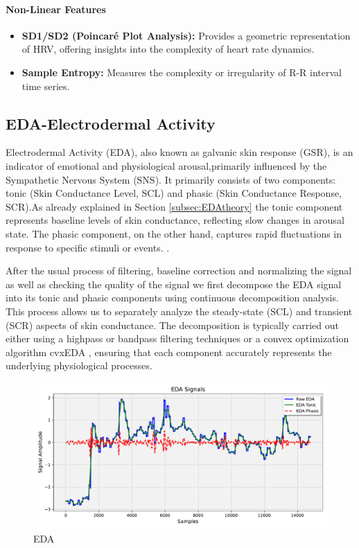 \paragraph*{Non-Linear Features}
\begin{itemize}
    \item \textbf{SD1/SD2 (Poincaré Plot Analysis):} Provides a geometric representation of HRV, offering insights into the complexity of heart rate dynamics.
    \item \textbf{Sample Entropy:} Measures the complexity or irregularity of R-R interval time series.
\end{itemize}


\subsection{EDA-Electrodermal Activity}

Electrodermal Activity (EDA), also known as galvanic skin response (GSR), is an indicator of emotional and physiological arousal,primarily influenced by the Sympathetic Nervous System (SNS). It primarily consists of two components: tonic (Skin Conductance Level, SCL) and phasic (Skin Conductance Response, SCR).As already explained in Section \ref*{subsec:EDAtheory} the tonic component represents baseline levels of skin conductance, reflecting slow changes in arousal state. The phasic component, on the other hand, captures rapid fluctuations in response to specific stimuli or events. \textcite{electrodermal}.

After the usual process of filtering, baseline correction and normalizing the signal as well as checking the quality of the signal we first decompose the EDA signal into its tonic and phasic components using continuous decomposition analysis. This process allows us to separately analyze the steady-state (SCL) and transient (SCR) aspects of skin conductance.
The decomposition is typically carried out either using a highpass or bandpass filtering techniques or a convex optimization algorithm cvxEDA \parencite{cvxEDA} , ensuring that each component accurately represents the underlying physiological processes.
\begin{figure}[!htbp]
	\centering
	\includegraphics[width=\columnwidth]{images/edaplot.pdf}
	\caption{EDA}
	\label{fig:eda sig}
\end{figure}

